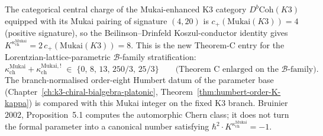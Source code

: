 \begin{remark}[Mukai doubling and the Koszul conductor \texorpdfstring{$K^{\kappa_{\mathrm{ch}}^{\mathrm{Mukai}}}=8$}{K-kappa-ch-Mukai=8}]
\label{rem:cy-to-chiral-mukai-doubling-K-ch}
The categorical central charge of the Mukai-enhanced K3 category
$D^b\mathrm{Coh}(K3)$ equipped with its Mukai pairing of signature $(4,20)$ is
$c_+(\mathrm{Mukai}(K3))=4$ (positive signature), so the Beilinson--Drinfeld
Koszul-conductor identity gives $K^{\kappa_{\mathrm{ch}}^{\mathrm{Mukai}}}=2\,c_+(\mathrm{Mukai}(K3))=8$.
This is the new Theorem-C entry for the Lorentzian-lattice-parametric
$\mathcal{B}$-family stratification:
\[
 \kappa_{\mathrm{ch}}^{\mathrm{Mukai}}+\kappa_{\mathrm{ch}}^{\mathrm{Mukai},!}
 \;\in\;
 \{0,\,8,\,13,\,250/3,\,25/3\}
 \qquad\text{(Theorem~C enlarged on the $\mathcal{B}$-family)}.
\]
The branch-normalised order-eight Humbert datum of the parameter base
(Chapter~\ref{ch:k3-chiral-bialgebra-platonic},
Theorem~\ref{thm:humbert-order-K-kappa}) is compared with this Mukai
integer on the fixed K3 branch. Bruinier \(2002\), Proposition~5.1
computes the automorphic Chern class; it does not turn the formal
parameter into a canonical number satisfying
\(\hbar^2\cdot K^{\kappa_{\mathrm{ch}}^{\mathrm{Mukai}}}=-1\).
\end{remark}

